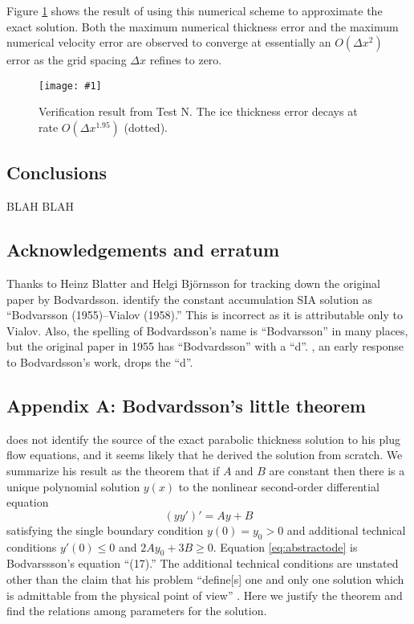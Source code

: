 \documentclass[twocolumn,letterpaper]{igs}
\newcommand{\onecol}[1]{\texttt{[image: \#1]}}
\begin{document}
Figure \ref{fig:verifNresult} shows the result of using this numerical scheme to approximate the exact solution.  Both the maximum numerical thickness error and the maximum numerical velocity error are observed to converge at essentially an $O(\Delta x^2)$ error as the grid spacing $\Delta x$ refines to zero.  

\begin{figure}[ht]
\onecol{verifN}
\caption{Verification result from Test N.  The ice thickness error decays at rate $O(\Delta x^{1.95})$ (dotted).} \label{fig:verifNresult}
\end{figure}


\subsection*{Conclusions} BLAH BLAH

\subsection*{Acknowledgements and erratum}  Thanks to Heinz Blatter and Helgi Bj\"ornsson for tracking down the original paper by Bodvardsson.  \cite{BLKCB} identify the constant accumulation SIA solution as ``Bodvarsson (1955)--Vialov (1958).''  This is incorrect as it is attributable only to Vialov.  Also, the spelling of Bodvardsson's name is ``Bodvarsson'' in many places, but the original paper in 1955 has ``Bodvardsson'' with a ``d''.  \cite{Weertman61stability}, an early response to Bodvardsson's work, drops the ``d''.





\appendix

\subsection{Appendix A: Bodvardsson's little theorem}  \cite{Bodvardsson} does not identify the source of the exact parabolic thickness solution to his plug flow equations, and it seems likely that he derived the solution from scratch.  We summarize his result as the theorem that if $A$ and $B$ are constant then there is a unique polynomial solution $y(x)$ to the nonlinear second-order differential equation
\begin{equation}
  (y y')' = Ay+B  \label{eq:abstractode}
\end{equation}
satisfying the single boundary condition $y(0) = y_0 > 0$ and additional technical conditions $y'(0) \le 0$ and $2A y_0 + 3 B \ge 0$.  Equation \eqref{eq:abstractode} is Bodvarssson's equation ``(17).''  The additional technical conditions are unstated other than the claim that his problem ``define[s] one and only one solution which is admittable from the physical point of view'' \citep{Bodvardsson}.  Here we justify the theorem and find the relations among parameters for the solution.
\end{document}
